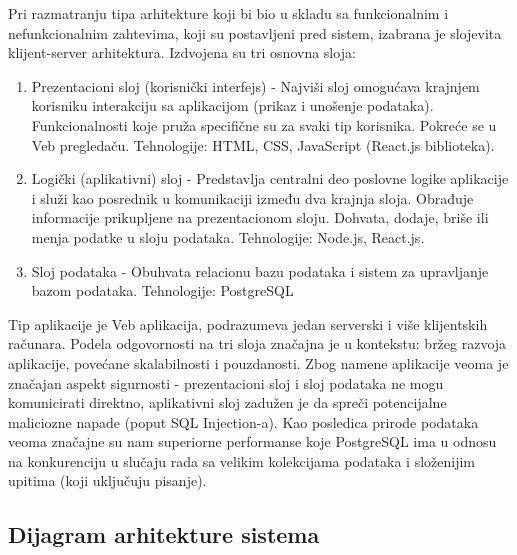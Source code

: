 \documentclass{article}
\begin{document}
Pri razmatranju tipa arhitekture koji bi bio u skladu sa funkcionalnim i nefunkcionalnim zahtevima, koji su postavljeni pred sistem, izabrana je slojevita klijent-server arhitektura. Izdvojena su tri osnovna sloja:
\begin{enumerate}
    \item Prezentacioni sloj (korisnički interfejs) - Najviši sloj omogućava krajnjem korisniku interakciju sa aplikacijom (prikaz i unošenje podataka). Funkcionalnosti koje pruža specifične su za svaki tip korisnika. Pokreće se u Veb pregledaču. Tehnologije: HTML, CSS, JavaScript (React.js biblioteka).
    \item Logički (aplikativni) sloj - Predstavlja centralni deo poslovne logike aplikacije i služi kao posrednik u komunikaciji između dva krajnja sloja. Obrađuje informacije prikupljene na prezentacionom sloju. Dohvata, dodaje, briše ili menja podatke u sloju podataka. Tehnologije: Node.js, React.js.
    \item Sloj podataka - Obuhvata relacionu bazu podataka i sistem za upravljanje bazom podataka. Tehnologije: PostgreSQL
\end{enumerate}

Tip aplikacije je Veb aplikacija, podrazumeva jedan serverski i više klijentskih računara. Podela odgovornosti na tri sloja značajna je u kontekstu: bržeg razvoja aplikacije, povećane skalabilnosti i pouzdanosti. Zbog namene aplikacije veoma je značajan aspekt sigurnosti - prezentacioni sloj i sloj podataka ne mogu komunicirati direktno, aplikativni sloj zadužen je da spreči potencijalne maliciozne napade (poput SQL Injection-a). Kao posledica prirode podataka veoma značajne su nam superiorne performanse koje PostgreSQL ima u odnosu na konkurenciju u slučaju rada sa velikim kolekcijama podataka i složenijim upitima (koji uključuju pisanje).

\newpage
\subsection{Dijagram arhitekture sistema}
\end{document}
